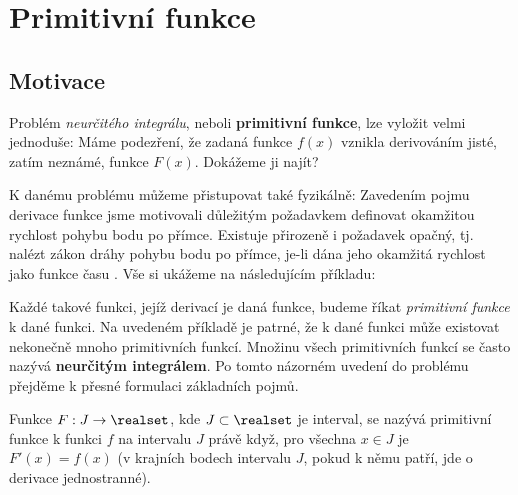 \setchaptertoc
\chapter{Primitivní funkce}

  \section{Motivace}
    Problém \emph{neurčitého integrálu}, neboli \textbf{primitivní funkce}, lze vyložit velmi 
    jednoduše: Máme podezření, že zadaná funkce \(f(x)\) vznikla derivováním jisté, zatím neznámé, 
    funkce \(F(x)\). Dokážeme ji najít? 
  
    K danému problému můžeme přistupovat také fyzikálně: Zavedením pojmu derivace funkce jsme 
    motivovali důležitým požadavkem definovat okamžitou rychlost pohybu bodu po přímce. Existuje 
    přirozeně i požadavek opačný, tj. nalézt zákon dráhy pohybu bodu po přímce, je-li dána jeho 
    okamžitá rychlost jako funkce času \cite[s.~253]{Brabec1989}. Vše si ukážeme na následujícím 
    příkladu:      
    
    Každé takové funkci, jejíž derivací je daná funkce, budeme říkat \emph{primitivní funkce} k 
    dané funkci. Na uvedeném příkladě je patrné, že k dané funkci může existovat nekonečně mnoho 
    primitivních funkcí. Množinu všech primitivních funkcí se často nazývá \textbf{neurčitým 
    integrálem}. Po tomto názorném uvedení do problému přejděme k přesné formulaci základních pojmů.
    
    \begin{definition} 
      Funkce $F: J\rightarrow \realset$, kde $J\subset \realset$ je interval, se nazývá primitivní 
      funkce k funkci \(f\) na intervalu \(J\) právě když, pro všechna $x\in J$ je $F'(x) = f(x)$ 
      (v krajních bodech intervalu \(J\), pokud k němu patří, jde o derivace jednostranné).
    \end{definition}
    
